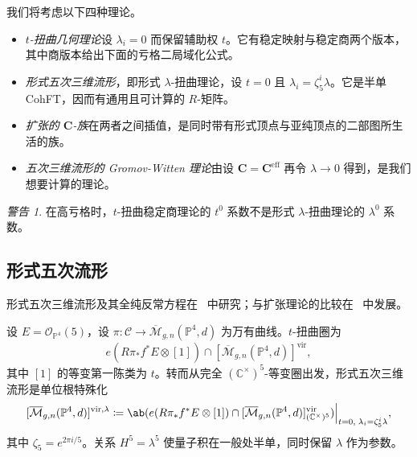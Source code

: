 \documentclass{amsart}
\theoremstyle{definition}
\theoremstyle{remark}
\newtheorem{warn}[thm]{警告}
\theoremstyle{plain}
\theoremstyle{definition}
\theoremstyle{remark}
\newcommand{\C}{\mathbb{C}}
\renewcommand{\P}{\mathbb{P}}
\newcommand{\Mbar}{\overline{\mathcal{M}}}
\newcommand{\mc}[1]{\mathcal{#1}}
\newcommand{\mbf}[1]{\mathbf{#1}}
\newcommand{\mr}[1]{\mathrm{#1}}
\newcommand{\1}{\mathbf{1}}
\newcommand{\2}{\mathbf{2}}
\newcommand{\3}{\mathbf{3}}
\newcommand{\vir}{\mr{vir}}
\begin{document}
我们将考虑以下四种理论。
\begin{itemize}
    \item \textit{\(t\)-扭曲几何理论}设 \(\lambda_i = 0\) 而保留辅助权 \(t\)。它有稳定映射与稳定商两个版本，其中商版本给出下面的亏格二局域化公式。
    \item \textit{形式五次三维流形}，即形式 \(\lambda\)-扭曲理论，设 \(t = 0\) 且 \(\lambda_i = \zeta_5^i \lambda\)。它是半单 CohFT，因而有通用且可计算的 \(R\)-矩阵。
    \item \textit{扩张的 \(\mbf{C}\)-族}在两者之间插值，是同时带有形式顶点与亚纯顶点的二部图所生活的族。
    \item \textit{五次三维流形的 Gromov-Witten 理论}由设 \(\mbf{C} = \mbf{C}^{\mr{eff}}\) 再令 \(\lambda \to 0\) 得到，是我们想要计算的理论。
\end{itemize}

\begin{warn}
    在高亏格时，\(t\)-扭曲稳定商理论的 \(t^0\) 系数不是形式 \(\lambda\)-扭曲理论的 \(\lambda^0\) 系数。
\end{warn}

\subsection{形式五次流形}%
\label{sub:The formal quintic}

形式五次三维流形及其全纯反常方程在~\cite{LhoPandharipande2019} 中研究；与扩张理论的比较在~\cite{GJRstructure} 中发展。

设 \(E = \mc{O}_{\P^4}(5)\)，设 \(\pi \colon \mc{C} \to \Mbar_{g,n}(\P^4,d)\) 为万有曲线。\(t\)-扭曲圈为
\[ e(R\pi_* f^* E \otimes [1]) \cap [\Mbar_{g,n}(\P^4,d)]^{\vir}, \]
其中 \([1]\) 的等变第一陈类为 \(t\)。转而从完全 \((\C^{\times})^5\)-等变圈出发，形式五次三维流形是单位根特殊化
\[ [\Mbar_{g,n}(\P^4,d)]^{\vir,\lambda} \coloneqq \ab( e(R\pi_*f^*E \otimes [1]) \cap [\Mbar_{g,n}(\P^4,d)]^{\vir}_{(\C^{\times})^5})\Big|_{t=0, \; \lambda_i = \zeta_5^i \lambda}, \]
其中 \(\zeta_5 = e^{2\pi i/5}\)。关系 \(H^5 = \lambda^5\) 使量子积在一般处半单，同时保留 \(\lambda\) 作为参数。
\end{document}
